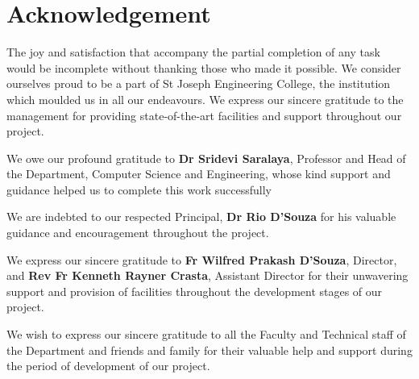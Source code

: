 \documentclass[12pt,a4paper]{report}
\begin{document}
\newpage

\chapter*{\centering Acknowledgement}
The joy and satisfaction that accompany the partial completion of any task would be incomplete without thanking those who made it possible. We consider ourselves proud to be a part of St Joseph Engineering College, the institution which moulded us in all our endeavours. We express our sincere gratitude to the management for providing state-of-the-art facilities and support throughout our project.
\par
\vspace{0.15in}
\noindent We owe our profound gratitude to \textbf{Dr Sridevi Saralaya}, Professor and Head of the Department, Computer Science and Engineering, whose kind support and guidance helped us to complete this work successfully
\par
\vspace{0.15in}
\noindent We are indebted to our respected Principal, \textbf{Dr Rio D’Souza} for his valuable guidance and encouragement throughout the project.
\par
\vspace{0.15in}
\noindent We express our sincere gratitude to \textbf{Fr Wilfred Prakash D'Souza}, Director, and \textbf{Rev Fr Kenneth Rayner Crasta}, Assistant Director for their unwavering support and provision of facilities throughout the development stages of our project.
\par
\vspace{0.15in}
\noindent We wish to express our sincere gratitude to all the Faculty and Technical staff of the Department and friends and family for their valuable help and support during the period of development of our project.


\pagestyle{plain}
\end{document}
